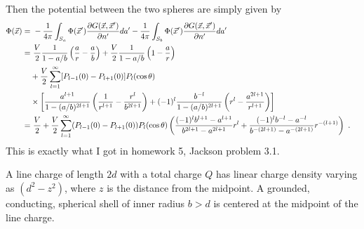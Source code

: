 \documentclass[12pt]{article}
\begin{document}
Then the potential between the two spheres are simply given by
\begin{align}
    \Phi(\vec x) =&~ - \frac{1}{4\pi} \int_{S_a} \Phi(\vec x') \frac{\partial G(\vec x, \vec x')}{\partial n'} da' - \frac{1}{4\pi} \int_{S_b} \Phi(\vec x') \frac{\partial G(\vec x, \vec x')}{\partial n'}da'\cr
    =&~ \frac{V}{2} \frac{1}{1-a/b}\left(\frac{a}{r} - \frac{a}{b}\right) + \frac{V}{2} \frac{1}{1-a/b}\left(1 - \frac{a}{r}\right) \cr
    &+ \frac{V}{2} \sum_{l = 1}^\infty [P_{l-1}(0)-P_{l+1}(0)]P_l(\cos \theta) \cr
    & \times \left[\frac{a^{l+1}}{1-(a/b)^{2l+1}}\left(\frac{1}{r^{l+1}} - \frac{r^l}{b^{2l+1}}\right) + (-1)^l \frac{b^{-l}}{1-(a/b)^{2l+1}} \left(r^l - \frac{a^{2l+1}}{r^{l+1}}\right)\right]\cr
    =&~ \frac{V}{2} + \frac{V}{2}\sum_{l=1}^\infty(P_{l-1}(0) - P_{l+1}(0)) P_l(\cos\theta) \left(
        \frac{(-1)^l b^{l+1} - a^{l+1} }{b^{2l+1} - a^{2l+1} }r^l + \frac{(-1)^l b^{-l}-a^{-l} }{b^{-(2l+1)} - a^{-(2l+1)} } r^{-(l+1)}
    \right)~.\nonumber
\end{align}
This is exactly what I got in homework 5, Jackson problem 3.1.

\newpage
{} A line charge of length $2d$ with a total charge $Q$ has linear charge density varying as $(d^2 - z^2)$, where $z$ is the distance from the midpoint. A grounded, conducting, spherical shell of inner radius $b > d$ is centered at the midpoint of the line charge.
\end{document}
